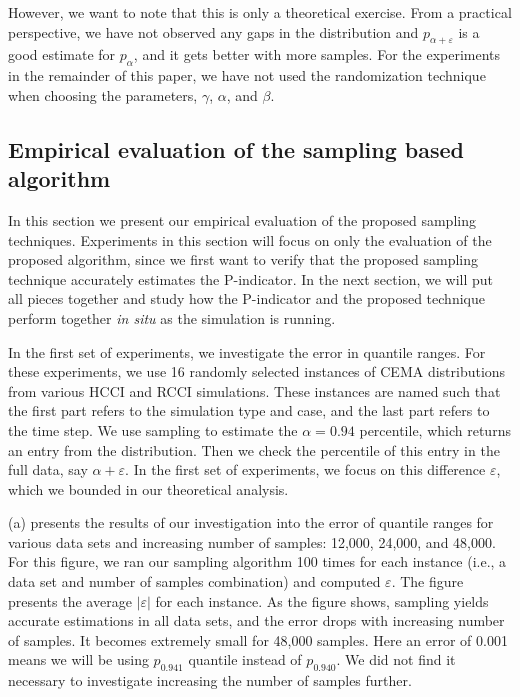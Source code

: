 \documentclass[final]{siamltex}
\newcommand{\eps}{\varepsilon}
\newcommand{\pmetric}{P}
\newcommand{\pt}{{p}}
\begin{document}
However, we want to note that this is only a theoretical exercise. 
From a practical perspective, we have not observed  any  gaps in the distribution and ${\pt}_{\alpha+\eps}$ is a good estimate for ${\pt}_{\alpha}$, and it gets better with more samples.  For the  experiments in the remainder of this  paper, we have not  used  the randomization technique when choosing the parameters, $\gamma$, $\alpha$, and $\beta$.  

\subsection{Empirical  evaluation of the sampling based  algorithm}
In this section we present our empirical evaluation of the proposed  sampling
techniques.  Experiments  in this section  will focus on only the  evaluation
of  the proposed algorithm,  since we first want to verify  that the proposed
sampling  technique accurately estimates the \pmetric-indicator. In the next
section, we will put all pieces together  and study how  the
\pmetric-indicator and  the proposed technique perform together \emph{in situ}
as the simulation is running.

In the first set of experiments, we investigate the error in quantile ranges. For these experiments, we  use 16 randomly selected instances  of CEMA  distributions from various HCCI and RCCI simulations.   These  instances are named  such that the first part refers to the simulation  type  and case, and the last part refers to the  time step. 
We use sampling to estimate the $\alpha=0.94$ percentile, which returns an entry from  the distribution. Then we check the  percentile of this entry in the full data, say $\alpha+\eps$.  In the first set of experiments, we focus on this difference $\eps$, which we bounded in our theoretical analysis.   

 (a) presents  the results of our investigation into the error of
quantile ranges for various data sets and increasing number of samples: 12,000, 24,000, and 48,000.  For this figure, we ran our sampling  algorithm 100 times  for each instance (i.e.,  a data set  and number of samples combination) and  computed $\eps$.  The figure presents the average  $|\eps |$ for each instance. As the figure shows, sampling  yields accurate  estimations in all data sets, and the error drops with increasing number of samples. It becomes extremely small for 48,000 samples.   Here an error of 0.001 means we will be using ${\pt}_{0.941}$ quantile instead of ${\pt}_{0.940}$.  We  did not find it necessary to investigate increasing the number of samples further.
\end{document}
